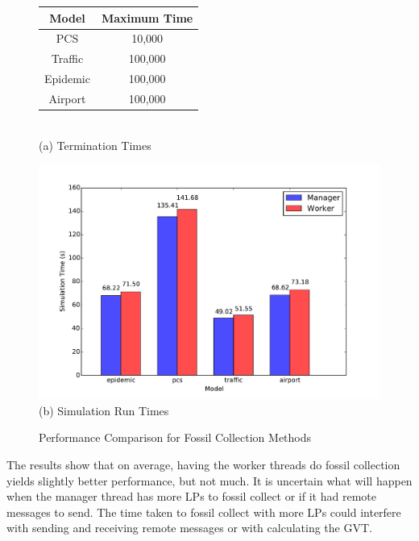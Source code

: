 \documentclass[11pt]{book}
\begin{document}
\begin{figure}
  \begin{minipage}{.5\textwidth}
    \begin{center}
      \begin{tabular}{| c | c |}
        \hline
        Model   & Maximum Time \\
        \hline
        PCS     & 10,000  \\
        Traffic & 100,000 \\
        Epidemic& 100,000 \\
        Airport & 100,000 \\
        \hline
      \end{tabular}\\
      (a) Termination Times
    \end{center}
  \end{minipage}%
  \hfill
  \begin{minipage}{.5\textwidth}
    \begin{center}
      \includegraphics[width=\textwidth,quiet]{figs/fossil_collection/simulation_times.pdf}\\
      (b) Simulation Run Times
    \end{center}
  \end{minipage}
  \caption{Performance Comparison for Fossil Collection Methods}\label{fc_times}
\end{figure}

The results show that on average, having the worker threads do fossil collection yields slightly
better performance, but not much. It is uncertain what will happen when the manager thread has
more LPs to fossil collect or if it had remote messages to send. The time taken to fossil collect
with more LPs could interfere with sending and receiving remote messages or with calculating
the GVT.
\end{document}
